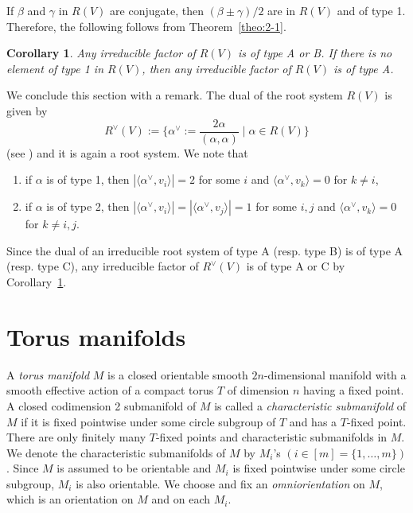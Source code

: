 \documentclass[12pt]{amsart}
\theoremstyle{plain} \numberwithin{equation}{section}
\newtheorem{coro}[theo]{Corollary}
\theoremstyle{definition}
\def\MV{V}
\begin{document}
If $\beta$ and $\gamma$ in $R(\MV)$ are conjugate, %
then $(\beta\pm\gamma)/2$ are in $R(\MV)$ and of type 1. Therefore, the following follows from Theorem~\ref{theo:2-1}. 

\begin{coro} \label{coro:2-1} 
Any irreducible factor of $R(\MV)$ is of type A or B.  If there is no element of type 1 in $R(\MV)$, then any irreducible factor of $R(\MV)$ is of type A.
\end{coro}

We conclude this section with a remark.  The dual of the root system $R(\MV)$ is given by 
\[
R^\vee(\MV):=\{ \alpha^\vee:=\frac{2\alpha}{(\alpha,\alpha)}\mid \alpha\in R(\MV)\}
\]
(see \cite[p. 43]{hump72}) and it is again a root system.  We note that 
\begin{enumerate}
\item  if $\alpha$ is of type 1, then $|\langle\alpha^\vee,v_i\rangle|=2$ for some $i$ and $\langle\alpha^\vee,v_k\rangle=0$ for $k\not=i$,
\item  if $\alpha$ is of type 2, then $|\langle \alpha^\vee,v_i\rangle|=|\langle \alpha^\vee,v_j\rangle|=1$ for some $i,j$ and $\langle\alpha^\vee,v_k\rangle=0$ for $k\not=i,j$. 
\end{enumerate}
Since the dual of an irreducible root system of type A (resp. type B) is of type A (resp. type C), any irreducible factor of $R^\vee(\MV)$ is of type A or C by Corollary~\ref{coro:2-1}.  

\section{Torus manifolds} \label{sect:3}

A \emph{torus manifold} $M$ is a closed orientable smooth $2n$-dimensional manifold %
with a smooth effective action of a compact torus $T$ of dimension $n$ having a fixed point.   
A closed codimension 2 submanifold of $M$ is called a \emph{characteristic submanifold} of $M$ if it is fixed pointwise under some circle subgroup of $T$ and has a $T$-fixed point.  There are only finitely many $T$-fixed points and characteristic submanifolds in $M$.  We denote the characteristic submanifolds of $M$ by $M_i$'s $(i\in [m]=\{1,\dots,m\})$.  Since $M$ is assumed to be orientable and $M_i$ is fixed pointwise under some circle subgroup, $M_i$ is also orientable.  We choose and fix an \emph{omniorientation} on $M$, which is an orientation on $M$ and on each $M_i$.
\end{document}
